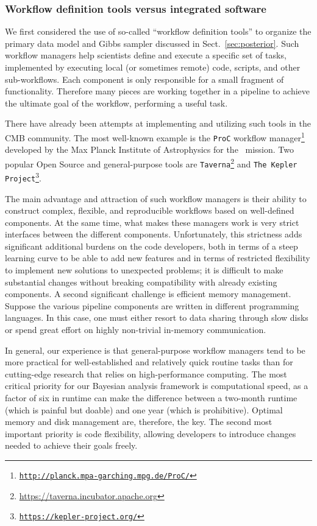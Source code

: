 \documentclass[twocolumn]{aa}
\begin{document}
\subsubsection{Workflow definition tools versus integrated software}

We first considered the use of so-called ``workflow definition tools'' to organize the primary data model and Gibbs sampler discussed in Sect.~\ref{sec:posterior}. Such workflow managers help scientists define and execute a specific set of tasks, implemented by executing local (or sometimes remote) code, scripts, and other sub-workflows. Each component is only responsible for a small fragment of functionality. Therefore many pieces are working together in a pipeline to achieve the ultimate goal of the workflow, performing a useful task.

There have already been attempts at implementing and utilizing such tools in the CMB community. The most well-known example is the \texttt{ProC} workflow manager\footnote{\href{http://planck.mpa-garching.mpg.de/ProC/}
{\texttt{http://planck.mpa-garching.mpg.de/ProC/}}} developed by the Max Planck Institute of Astrophysics for the \Planck\ mission. Two popular Open Source and general-purpose tools are \texttt{Taverna}\footnote{\url{https://taverna.incubator.apache.org}} and \texttt{The Kepler Project}\footnote{\href{https://kepler-project.org/}
{\texttt{https://kepler-project.org/}}}.

The main advantage and attraction of such workflow managers is their ability to construct complex, flexible, and reproducible workflows based on well-defined components. At the same time, what makes these managers work is very strict interfaces between the different components. Unfortunately, this strictness adds significant additional burdens on the code developers, both in terms of a steep learning curve to be able to add new features and in terms of restricted flexibility to implement new solutions to unexpected problems; it is difficult to make substantial changes without breaking compatibility with already existing components. A second significant challenge is efficient memory management. Suppose the various pipeline components are written in different programming languages. In this case, one must either resort to data sharing through slow disks or spend great effort on highly non-trivial in-memory communication.

In general, our experience is that general-purpose workflow managers tend to be more practical for well-established and relatively quick routine tasks than for cutting-edge research that relies on high-performance computing. The most critical priority for our Bayesian analysis framework is computational speed, as a factor of six in runtime can make the difference between a two-month runtime (which is painful but doable) and one year (which is prohibitive). Optimal memory and disk management are, therefore, the key. The second most important priority is code flexibility, allowing developers to introduce changes needed to achieve their goals freely.
\end{document}
